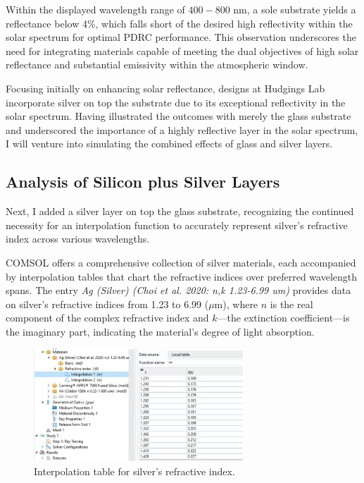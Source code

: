 Within the displayed wavelength range of $400 - 800$ nm, a sole substrate yields a reflectance below 4\%, which falls short of the desired high reflectivity within the solar spectrum for optimal PDRC performance. This observation underscores the need for integrating materials capable of meeting the dual objectives of high solar reflectance and substantial emissivity within the atmospheric window.

Focusing initially on enhancing solar reflectance, designs at Hudgings Lab incorporate silver on top the substrate due to its exceptional reflectivity in the solar spectrum. Having illustrated the outcomes with merely the glass substrate and underscored the importance of a highly reflective layer in the solar spectrum, I will venture into simulating the combined effects of glass and silver layers.

\subsection{Analysis of Silicon plus Silver Layers}
Next, I added a silver layer on top the glass substrate, recognizing the continued necessity for an interpolation function to accurately represent silver's refractive index across various wavelengths.

COMSOL offers a comprehensive collection of silver materials, each accompanied by interpolation tables that chart the refractive indices over preferred wavelength spans. The entry \emph{Ag (Silver) (Choi et al. 2020: n,k 1.23-6.99 um)} provides data on silver’s refractive indices from 1.23 to 6.99 ($\mu$m), where $n$ is the real component of the complex refractive index and $k$—the extinction coefficient—is the imaginary part, indicating the material's degree of light absorption.

\begin{figure}[H]
  \centering
  \includegraphics[width=0.7\textwidth]{Chapters/Figures/Chapter 4 Figures/Interpolation Table for Silver.png}
  \caption{Interpolation table for silver's refractive index.}
  \label{fig:Interpolation table for silver's refractive index}
\end{figure}

